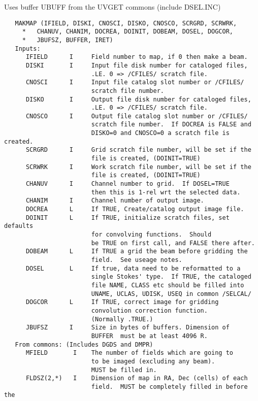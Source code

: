 Uses buffer UBUFF from the UVGET commons (include DSEL.INC)
\begin{verbatim}
   MAKMAP (IFIELD, DISKI, CNOSCI, DISKO, CNOSCO, SCRGRD, SCRWRK,
     *   CHANUV, CHANIM, DOCREA, DOINIT, DOBEAM, DOSEL, DOGCOR,
     *   JBUFSZ, BUFFER, IRET)
   Inputs:
      IFIELD      I     Field number to map, if 0 then make a beam.
      DISKI       I     Input file disk number for cataloged files,
                        .LE. 0 => /CFILES/ scratch file.
      CNOSCI      I     Input file catalog slot number or /CFILES/
                        scratch file number.
      DISKO       I     Output file disk number for cataloged files,
                        .LE. 0 => /CFILES/ scratch file.
      CNOSCO      I     Output file catalog slot number or /CFILES/
                        scratch file number.  If DOCREA is FALSE and
                        DISKO=0 and CNOSCO=0 a scratch file is created.
      SCRGRD      I     Grid scratch file number, will be set if the
                        file is created, (DOINIT=TRUE)
      SCRWRK      I     Work scratch file number, will be set if the
                        file is created, (DOINIT=TRUE)
      CHANUV      I     Channel number to grid.  If DOSEL=TRUE
                        then this is 1-rel wrt the selected data.
      CHANIM      I     Channel number of output image.
      DOCREA      L     If TRUE, Create/catalog output image file.
      DOINIT      L     If TRUE, initialize scratch files, set defaults
                        for convolving functions.  Should
                        be TRUE on first call, and FALSE there after.
      DOBEAM      L     If TRUE a grid the beam before gridding the
                        field.  See useage notes.
      DOSEL       L     If true, data need to be reformatted to a
                        single Stokes' type.  If TRUE, the cataloged
                        file NAME, CLASS etc should be filled into
                        UNAME, UCLAS, UDISK, USEQ in common /SELCAL/
      DOGCOR      L     If TRUE, correct image for gridding
                        convolution correction function.
                        (Normally .TRUE.)
      JBUFSZ      I     Size in bytes of buffers. Dimension of
                        BUFFER  must be at least 4096 R.
   From commons: (Includes DGDS and DMPR)
      MFIELD       I    The number of fields which are going to
                        to be imaged (excluding any beam).
                        MUST be filled in.
      FLDSZ(2,*)   I    Dimension of map in RA, Dec (cells) of each
                        field.  MUST be completely filled in before the

\end{verbatim}
